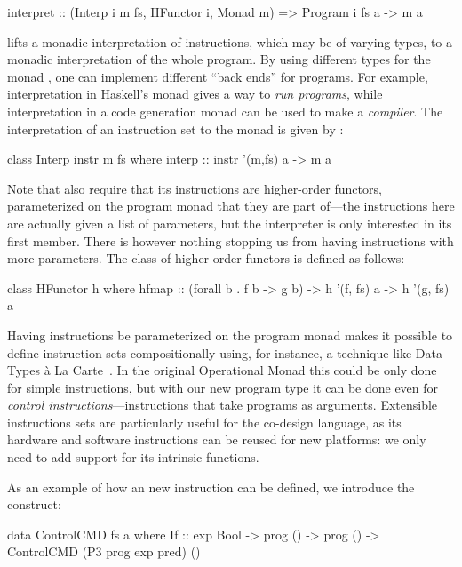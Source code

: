 \documentclass[../main.tex]{subfiles}
\begin{document}
\begin{code}
interpret :: (Interp i m fs, HFunctor i, Monad m) => Program i fs a -> m a
\end{code}

 lifts a monadic interpretation of instructions, which may be of varying types, to a monadic interpretation of the whole program. By using different types for the monad , one can implement different ``back ends'' for programs. For example, interpretation in Haskell's  monad gives a way to \emph{run programs}, while interpretation in a code generation monad can be used to make a \emph{compiler}. The interpretation of an instruction set  to the monad  is given by :

\begin{code}
class Interp instr m fs where
  interp :: instr '(m,fs) a -> m a
\end{code}

Note that  also require that its instructions are higher-order functors, parameterized on the program monad that they are part of---the instructions here are actually given a list of parameters, but the interpreter is only interested in its first member. There is however nothing stopping us from having instructions with more parameters. The  class of higher-order functors is defined as follows:

\begin{code}
class HFunctor h where
  hfmap :: (forall b . f b -> g b) -> h '(f, fs) a -> h '(g, fs) a
\end{code}

Having instructions be parameterized on the program monad makes it possible to define instruction sets compositionally using, for instance, a technique like Data Types \`{a} La Carte~\cite{DTC}. In the original Operational Monad this could be only done for simple instructions, but with our new program type it can be done even for \emph{control instructions}---instructions that take programs as arguments. Extensible instructions sets are particularly useful for the co-design language, as its hardware and software instructions can be reused for new platforms: we only need to add support for its intrinsic functions.

As an example of how an new instruction can be defined, we introduce the  construct:

\begin{code}
data ControlCMD fs a where
  If :: exp Bool -> prog () -> prog () -> ControlCMD (P3 prog exp pred) ()
\end{code}
\end{document}
